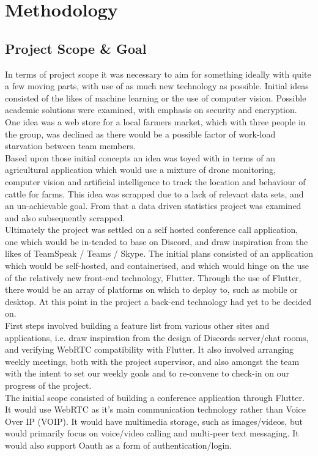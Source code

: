 \chapter{Methodology}
\section{Project Scope \& Goal}
In terms of project scope it was necessary to aim for something ideally with quite a few moving parts, with use of as much new technology as possible. Initial ideas consisted of the likes of machine learning or the use of computer vision. Possible academic solutions were examined, with emphasis on security and encryption. One idea was a web store for a local farmers market, which with three people in the group, was declined as there would be a possible factor of work-load starvation between team members. 
\\ Based upon those initial concepts an idea was toyed with in terms of an agricultural application which would use a mixture of drone monitoring, computer vision and artificial intelligence to track the location and behaviour of cattle for farms. This idea was scrapped due to a lack of relevant data sets, and an un-achievable goal. From that a data driven statistics project was examined and also subsequently scrapped. 
\\ Ultimately the project was settled on a self hosted conference call application, one which would be in-tended to base on Discord, and draw inspiration from the likes of TeamSpeak / Teams / Skype. The initial plans consisted of an application which would be self-hosted, and containerised, and which would hinge on the use of the relatively new front-end technology, Flutter. Through the use of Flutter, there would be an array of platforms on which to deploy to, such as mobile or desktop. At this point in the project a back-end technology had yet to be decided on.
\\ First steps involved building a feature list from various other sites and applications, i.e. draw inspiration from the design of Discords server/chat rooms, and verifying WebRTC compatibility with Flutter. It also involved arranging weekly meetings, both with the project supervisor, and also amongst the team with the intent to set our weekly goals and to re-convene to check-in on our progress of the project. 
\\ The initial scope consisted of building a conference application through Flutter. It would use WebRTC as it’s main communication technology rather than Voice Over IP (VOIP). It would have multimedia storage, such as images/videos, but would primarily focus on voice/video calling and multi-peer text messaging. It would also support Oauth as a form of authentication/login. 

